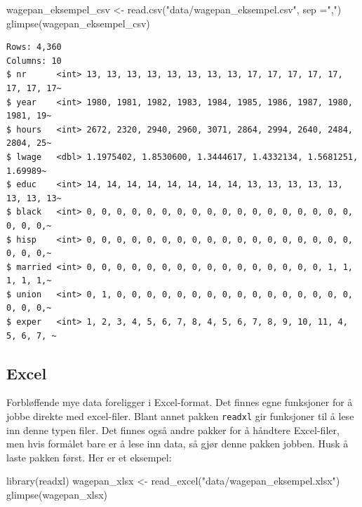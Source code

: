 \documentclass[
  norsk,
  letterpaper,
  DIV=11,
  numbers=noendperiod]{scrreprt}
\newenvironment{Shaded}{\begin{snugshade}}{\end{snugshade}}
\newcommand{\AttributeTok}[1]{\textcolor[rgb]{0.40,0.45,0.13}{#1}}
\newcommand{\FunctionTok}[1]{\textcolor[rgb]{0.28,0.35,0.67}{#1}}
\newcommand{\NormalTok}[1]{\textcolor[rgb]{0.00,0.23,0.31}{#1}}
\newcommand{\OtherTok}[1]{\textcolor[rgb]{0.00,0.23,0.31}{#1}}
\newcommand{\StringTok}[1]{\textcolor[rgb]{0.13,0.47,0.30}{#1}}
\theoremstyle{definition}
\theoremstyle{remark}
\begin{document}
\begin{Shaded}
\begin{Highlighting}[]
\NormalTok{wagepan\_eksempel\_csv }\OtherTok{\textless{}{-}} \FunctionTok{read.csv}\NormalTok{(}\StringTok{"data/wagepan\_eksempel.csv"}\NormalTok{, }\AttributeTok{sep =}\StringTok{","}\NormalTok{)}
\FunctionTok{glimpse}\NormalTok{(wagepan\_eksempel\_csv)}
\end{Highlighting}
\end{Shaded}

\begin{verbatim}
Rows: 4,360
Columns: 10
$ nr      <int> 13, 13, 13, 13, 13, 13, 13, 13, 17, 17, 17, 17, 17, 17, 17, 17~
$ year    <int> 1980, 1981, 1982, 1983, 1984, 1985, 1986, 1987, 1980, 1981, 19~
$ hours   <int> 2672, 2320, 2940, 2960, 3071, 2864, 2994, 2640, 2484, 2804, 25~
$ lwage   <dbl> 1.1975402, 1.8530600, 1.3444617, 1.4332134, 1.5681251, 1.69989~
$ educ    <int> 14, 14, 14, 14, 14, 14, 14, 14, 13, 13, 13, 13, 13, 13, 13, 13~
$ black   <int> 0, 0, 0, 0, 0, 0, 0, 0, 0, 0, 0, 0, 0, 0, 0, 0, 0, 0, 0, 0, 0,~
$ hisp    <int> 0, 0, 0, 0, 0, 0, 0, 0, 0, 0, 0, 0, 0, 0, 0, 0, 0, 0, 0, 0, 0,~
$ married <int> 0, 0, 0, 0, 0, 0, 0, 0, 0, 0, 0, 0, 0, 0, 0, 0, 1, 1, 1, 1, 1,~
$ union   <int> 0, 1, 0, 0, 0, 0, 0, 0, 0, 0, 0, 0, 0, 0, 0, 0, 0, 0, 0, 0, 0,~
$ exper   <int> 1, 2, 3, 4, 5, 6, 7, 8, 4, 5, 6, 7, 8, 9, 10, 11, 4, 5, 6, 7, ~
\end{verbatim}

\subsection{Excel}\label{excel}

Forbløffende mye data foreligger i Excel-format. Det finnes egne
funksjoner for å jobbe direkte med excel-filer. Blant annet pakken
\texttt{readxl} gir funksjoner til å lese inn denne typen filer. Det
finnes også andre pakker for å håndtere Excel-filer, men hvis formålet
bare er å lese inn data, så gjør denne pakken jobben. Husk å laste
pakken først. Her er et eksempel:

\begin{Shaded}
\begin{Highlighting}[]
\FunctionTok{library}\NormalTok{(readxl)}
\NormalTok{wagepan\_xlsx }\OtherTok{\textless{}{-}} \FunctionTok{read\_excel}\NormalTok{(}\StringTok{"data/wagepan\_eksempel.xlsx"}\NormalTok{)}
\FunctionTok{glimpse}\NormalTok{(wagepan\_xlsx)}
\end{Highlighting}
\end{Shaded}
\end{document}
